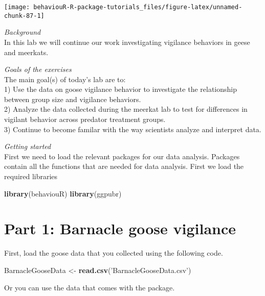 \documentclass[]{book}
\newenvironment{Shaded}{\begin{snugshade}}{\end{snugshade}}
\newcommand{\KeywordTok}[1]{\textcolor[rgb]{0.13,0.29,0.53}{\textbf{#1}}}
\newcommand{\NormalTok}[1]{#1}
\newcommand{\StringTok}[1]{\textcolor[rgb]{0.31,0.60,0.02}{#1}}
\begin{document}
\begin{center}\texttt{[image: behaviouR-R-package-tutorials\_files/figure-latex/unnamed-chunk-87-1]} \end{center}

\emph{Background}\\
In this lab we will continue our work investigating vigilance behaviors in geese and meerkats.

\emph{Goals of the exercises}\\
The main goal(s) of today's lab are to:\\
1) Use the data on goose vigilance behavior to investigate the relationship between group size and vigilance behaviors.\\
2) Analyze the data collected during the meerkat lab to test for differences in vigilant behavior across predator treatment groups.\\
3) Continue to become familar with the way scientists analyze and interpret data.

\emph{Getting started}\\
First we need to load the relevant packages for our data analysis. Packages contain all the functions that are needed for data analysis.
First we load the required libraries

\begin{Shaded}
\begin{Highlighting}[]
\KeywordTok{library}\NormalTok{(behaviouR)}
\KeywordTok{library}\NormalTok{(ggpubr)}
\end{Highlighting}
\end{Shaded}

\hypertarget{part-1-barnacle-goose-vigilance}{%
\section*{Part 1: Barnacle goose vigilance}\label{part-1-barnacle-goose-vigilance}}

First, load the goose data that you collected using the following code.

\begin{Shaded}
\begin{Highlighting}[]
\NormalTok{BarnacleGooseData <-}\StringTok{ }\KeywordTok{read.csv}\NormalTok{(}\StringTok{'BarnacleGooseData.csv'}\NormalTok{)}
\end{Highlighting}
\end{Shaded}

Or you can use the data that comes with the package.
\end{document}
